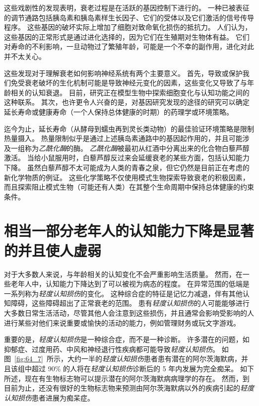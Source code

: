 这些戏剧性的发现表明，衰老过程是在活跃的基因控制下进行的。
一种已被表征的调节通路包括胰岛素和胰岛素样生长因子、它们的受体以及它们激活的信号传导程序。
这些基因的破坏实际上增加了细胞对致命氧化损伤的抵抗力。
人们认为，这些基因的正常形式是通过进化选择的，因为它们在生殖期对生物体有益。
它们对寿命的不利影响，一旦动物过了繁殖年龄，可能是一个不幸的副作用，进化对此并不太关心。


这些发现对于理解衰老如何影响神经系统有两个主要意义。
首先，导致或保护我们免受衰老破坏的生化机制可能是导致神经元变化的因素，这些变化又导致了与年龄相关的认知衰退。
目前，研究正在模型生物中探索细胞变化与认知功能之间的这种联系。
其次，也许更令人兴奋的是，对基因研究发现的途径的研究可以确定延长寿命或健康寿命（一个人保持总体健康的时期）的药理学或环境策略。


迄今为止，延长寿命（从酵母到蠕虫再到灵长类动物）的最佳验证环境策略是限制热量摄入。
热量限制似乎是通过上述胰岛素通路中的基因起作用的，并且可能涉及一组称为\textit{乙酰化酶}的酶。
\textit{乙酰化酶}被最初从红酒中分离出来的化合物白藜芦醇激活。
当给小鼠服用时，白藜芦醇反过来会延缓衰老的某些方面，包括认知能力下降。
虽然白藜芦醇不太可能成为人类的青春之泉，但它仍然是目前正在考虑的新化学物质的例证。
这些化学策略不仅使用模式生物探索导致衰老的积极因素，而且探索阻止模式生物（可能还有人类）在其整个生命周期中保持总体健康的约束条件。



\section{相当一部分老年人的认知能力下降是显著的并且使人虚弱}

对于大多数人来说，与年龄相关的认知变化不会严重影响生活质量。
然而，在一些老年人中，认知能力下降达到了可以被视为病态的程度。
在异常范围的低端是一系列称为\textit{轻度认知损伤}的变化。
这种综合症的特征是记忆力减退，伴有其他认知障碍，这些障碍超出了正常衰老的范围。
患有\textit{轻度认知损伤}的人可能能够进行大多数日常生活活动，尽管其他人会注意到这些损伤，并且通常会影响受影响的人进行某些对他们来说重要或愉快的活动的能力，例如管理财务或玩文字游戏。


重要的是，\textit{轻度认知损伤}是一种综合症，而不是一种诊断。
许多潜在的问题，如抑郁症、过度用药、中风和神经退行性疾病都可能导致\textit{轻度认知损伤}。
如图~\ref{fig:64_7}~所示，大约一半的\textit{轻度认知损伤}患者患有潜在的阿尔茨海默病，并且该组中超过 90\% 的人将在\textit{轻度认知损伤}诊断后的 5 年内发展为完全痴呆。
如下所述，现在有生物标志物可以提示潜在的阿尔茨海默病病理学的存在。
然而，到目前为止，还没有很好的生物标志物来预测由阿尔茨海默病以外的疾病引起的\textit{轻度认知损伤}患者进展为痴呆症。


